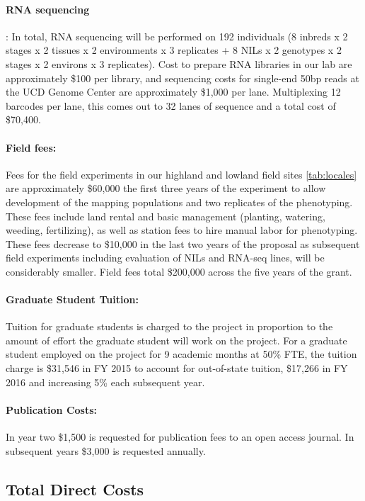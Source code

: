 \paragraph{RNA sequencing}:
In total, RNA sequencing will be performed on 192 individuals (8 inbreds x 2 stages x 2 tissues x 2 environments x 3 replicates + 8 NILs x 2 genotypes x 2 stages x 2 environs x 3 replicates).  Cost to prepare RNA libraries in our lab are approximately \$100 per library, and sequencing costs for single-end 50bp reads at the UCD Genome Center are approximately \$1,000 per lane.  Multiplexing 12 barcodes per lane, this comes out to 32 lanes of sequence and a total cost of \$70,400.

\paragraph{Field fees:}
Fees for the field experiments in our highland and lowland field sites \ref{tab:locales} are approximately \$60,000 the first three years of the experiment to allow development of the mapping populations and two replicates of the phenotyping.  These fees include land rental and basic management (planting, watering, weeding, fertilizing), as well as station fees to hire manual labor for phenotyping.  These fees decrease to \$10,000 in the last two years of the proposal as subsequent field experiments including evaluation of NILs and RNA-seq lines, will be considerably smaller. Field fees total \$200,000 across the five years of the grant.

\paragraph{Graduate Student Tuition:}
Tuition for graduate students is charged to the project in proportion to the amount of effort the graduate student will work on the project. For a graduate student employed on the project for 9 academic months at 50\% FTE, the tuition charge is \$31,546 in FY 2015 to account for out-of-state tuition, \$17,266 in FY 2016 and increasing 5\% each subsequent year.

\paragraph{Publication Costs:}
In year two \$1,500 is requested for publication fees to an open access journal.  In subsequent years \$3,000 is requested annually.

\subsection*{Total Direct Costs}

